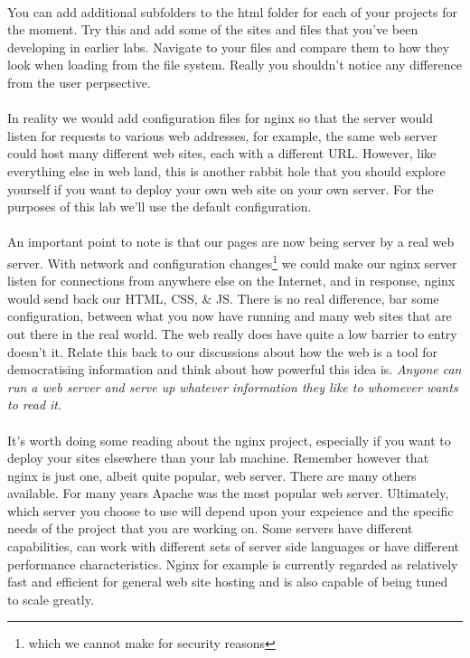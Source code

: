 \documentclass[10pt, a4paper, twosize]{article}
\begin{document}
\paragraph{} You can add additional subfolders to the html folder for each of your projects for the moment. Try this and add some of the sites and files that you've been developing in earlier labs. Navigate to your files and compare them to how they look when loading from the file system. Really you shouldn't notice any difference from the user perpsective.

\paragraph{} In reality we would add configuration files for nginx so that the server would listen for requests to various web addresses, for example, the same web server could host many different web sites, each with a different URL. However, like everything else in web land, this is another rabbit hole that you should explore yourself if you want to deploy your own web site on your own server. For the purposes of this lab we'll use the default configuration.

\paragraph{} An important point to note is that our pages are now being server by a real web server. With network and configuration changes\footnote{which we cannot make for security reasons} we could make our nginx server listen for connections from anywhere else on the Internet, and in response, nginx would send back our HTML, CSS, \& JS. There is no real difference, bar some configuration, between what you now have running and many web sites that are out there in the real world. The web really does have quite a low barrier to entry doesn't it. Relate this back to our discussions about how the web is a tool for democratising information and think about how powerful this idea is. \emph{Anyone can run a web server and serve up whatever information they like to whomever wants to read it}.

\paragraph{} It's worth doing some reading about the nginx project, especially if you want to deploy your sites elsewhere than your lab machine. Remember however that nginx is just one, albeit quite popular, web server. There are many others available. For many years Apache was the most popular web server. Ultimately, which server you choose to use will depend upon your expeience and the specific needs of the project that you are working on. Some servers have different capabilities, can work with different sets of server side languages or have different performance characteristics. Nginx for example is currently regarded as relatively fast and efficient for general web site hosting and is also capable of being tuned to scale greatly.
\end{document}
